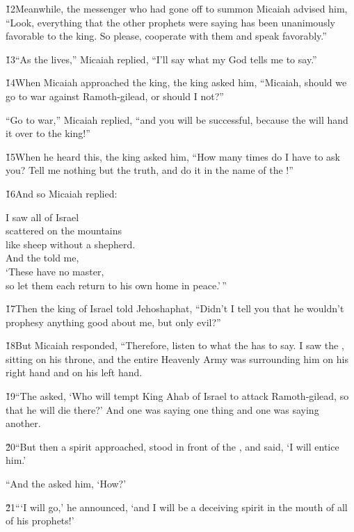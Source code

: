 \v{12}Meanwhile, the messenger who had gone off to summon Micaiah advised him, ``Look, everything that the other prophets were saying has been unanimously favorable to the king. So please, cooperate with them and speak favorably.''

\v{13}``As the  lives,'' Micaiah replied, ``I'll say what my God tells me to say.''

\v{14}When Micaiah approached the king, the king asked him, ``Micaiah, should we go to war against Ramoth-gilead, or should I not?''

``Go to war,'' Micaiah replied, ``and you will be successful, because the  will hand it over to the king!''

\v{15}When he heard this, the king asked him, ``How many times do I have to ask you? Tell me nothing but the truth, and do it in the name of the !''

\v{16}And so Micaiah replied:

\begin{poetry}
\poeml I saw all of Israel \\
\poemll    scattered on the mountains \\
\poemlll       like sheep without a shepherd. \\
\poeml And the  told me, \\
\poemll    `These have no master, \\
\poemlll       so let them each return to his own home in peace.'\,''
\end{poetry}

\v{17}Then the king of Israel told Jehoshaphat, ``Didn't I tell you that he wouldn't prophesy anything good about me, but only evil?''

\v{18}But Micaiah responded, ``Therefore, listen to what the  has to say. I saw the , sitting on his throne, and the entire Heavenly Army was surrounding him on his right hand and on his left hand.

\v{19}``The  asked, `Who will tempt King Ahab of Israel to attack Ramoth-gilead, so that he will die there?' And one was saying one thing and one was saying another.

\v{20}``But then a spirit approached, stood in front of the , and said, `I will entice him.'

``And the  asked him, `How?'

\v{21}```I will go,' he announced, `and I will be a deceiving spirit in the mouth of all of his prophets!'

